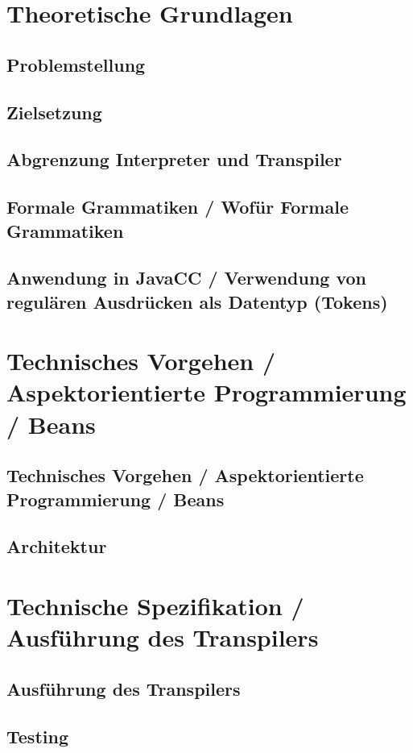 \section{Theoretische Grundlagen}
	\subsection{Problemstellung}
	\subsection{Zielsetzung}
	\subsection{Abgrenzung Interpreter und Transpiler}
	\subsection{Formale Grammatiken / Wofür Formale Grammatiken}
	\subsection{Anwendung in JavaCC / Verwendung von regulären Ausdrücken als Datentyp (Tokens)}

\section{Technisches Vorgehen / Aspektorientierte Programmierung / Beans}
	\subsection{Technisches Vorgehen / Aspektorientierte Programmierung / Beans }
	\subsection{Architektur} 

\section{Technische Spezifikation / Ausführung des Transpilers}
	\subsection{Ausführung des Transpilers}
	\subsection{Testing}

